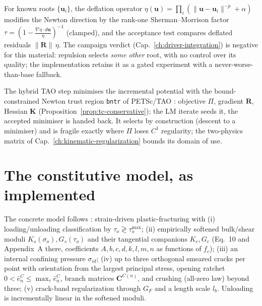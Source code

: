 \begin{definition}[Deflation]
For known roots $\{\mathbf u_i\}$, the deflation operator
\cite{FarrellBirkissonFunke2015}
$\eta(\mathbf u)=\prod_i\left(\lVert\mathbf u-\mathbf
u_i\rVert^{-p}+\alpha\right)$ modifies the Newton direction by the
rank-one Sherman--Morrison factor
$\tau = \left(1-\frac{\nabla\eta\cdot d\mathbf
u}{\eta}\right)^{-1}$ (clamped), and the acceptance test compares
deflated residuals $\lVert\mathbf R\rVert\,\eta$. The campaign verdict
(Cap.~\ref{ch:driver-integration}) is negative for this material:
repulsion selects \emph{some other} root, with no control over its
quality; the implementation retains it as a gated experiment with a
never-worse-than-base fallback.
\end{definition}

\begin{definition}
The hybrid TAO step minimises the incremental potential with the
bound-constrained Newton trust region \texttt{bntr} of PETSc/TAO
\cite{BalayPETScManual}: objective $\Pi$, gradient $\mathbf R$,
Hessian $\mathbf K$ (Proposition~\ref{prop:tc-conservative}); the LM
iterate seeds it, the accepted minimiser is handed back. It selects by
construction (descent to a minimiser) and is fragile exactly where
$\Pi$ loses $C^1$ regularity; the two-physics matrix of
Cap.~\ref{ch:kinematic-regularization} bounds its domain of use.
\end{definition}

\section{The constitutive model, as implemented}
\label{sec:tc-kobathe}

The concrete model follows \cite{KoBathe2026}: strain-driven
plastic-fracturing with (i) loading/unloading classification by
$\tau_o \gtrless \tau_o^{\max}$; (ii) empirically softened bulk/shear
moduli $K_s(\sigma_o), G_s(\tau_o)$ and their tangential companions
$K_c, G_c$ (Eq.~10 and Appendix~A there, coefficients
$A,b,c,d,k,l,m,n$ as functions of $f_c$); (iii) an internal confining
pressure $\sigma_{id}$; (iv) up to three orthogonal smeared cracks per
point with orientation from the largest principal stress, opening
ratchet $0<\bar e^{C}_n\le\max_\tau \bar e^{C}_n$, branch matrices
$\mathbf C^{C(n)}$, and crushing (all-zero law) beyond three; (v)
crack-band regularization through $G_F$ and a length scale $l_b$.
Unloading is incrementally linear in the softened moduli.

